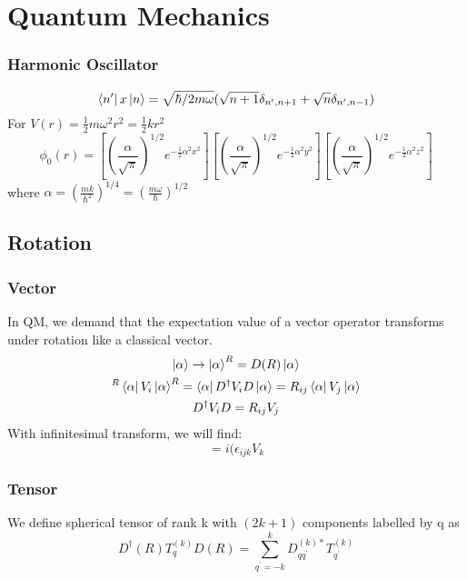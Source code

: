 \chapter{Quantum Mechanics}
\subsection{Harmonic Oscillator}
\[
    \bra{n'}x\ket{n}=\sqrt{\hbar/2m\omega}(\sqrt{n+1}\delta_{n',n+1}+\sqrt{n}\delta_{n',n-1})
    \]
For $V(r)=\frac{1}{2}m\omega^2r^2=\frac{1}{2}kr^2$
\[
    \phi_0(r)=[(\frac{\alpha}{\sqrt{\pi}})^{1/2}e^{-\frac{1}{2}\alpha^2x^2}]
    [(\frac{\alpha}{\sqrt{\pi}})^{1/2}e^{-\frac{1}{2}\alpha^2y^2}]
    [(\frac{\alpha}{\sqrt{\pi}})^{1/2}e^{-\frac{1}{2}\alpha^2z^2}]
    \]
where $\alpha=(\frac{mk}{\hbar^2})^{1/4}=(\frac{m\omega}{\hbar})^{1/2}$

\section{Rotation}

\subsection{Vector}
In QM, we demand that the expectation value of a vector operator transforms
under rotation like a classical vector.
\begin{gather*}
    \ket{\alpha}\rightarrow\ket{\alpha}^R=D(R)\ket{\alpha}\\
    ^{R}\bra{\alpha}V_i\ket{\alpha}^R=\bra{\alpha}D^{\dag}V_{i}D\ket{\alpha}=R_{ij}\bra{\alpha}V_j\ket{\alpha}\\
    D^{\dag}V_{i}D=R_{ij}V_j
\end{gather*}
With infinitesimal transform, we will find:
\begin{equation}
    [V_i,J_j]=i(\epsilon_{ijk}V_k
\end{equation}

\subsection{Tensor}
We define spherical tensor of rank k with $(2k+1)$ components labelled by q
as
\begin{equation}
    D^{\dag}(R)T^{(k)}_{q}D(R)=\displaystyle\sum_{q^\prime=-k}^{k}D^{(k)*}_{qq^\prime}T^{(k)}_{q^\prime}
\end{equation}
